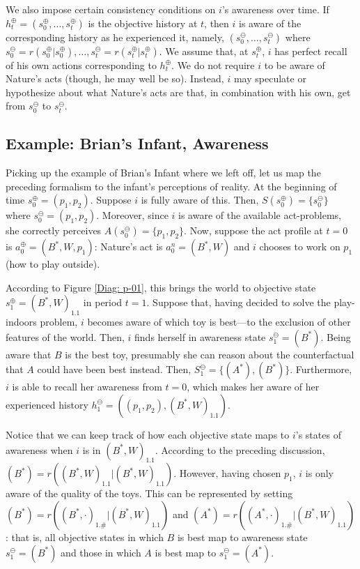 \documentclass[
11pt,
titlepage,
reqno,
]{article}%
\theoremstyle{definition}
\begin{document}
We also impose certain consistency conditions on $i$'s awareness over time.
If $h^\oplus_t=(s^\oplus_0,\ldots,s^\oplus_t)$ is the objective history at $t$, then $i$ is aware of the corresponding history as he experienced it, namely, $(s^\ominus_0,\ldots,s^\ominus_t)$ where $s^\ominus_0=r(s^\oplus_0|s^\oplus_0),\ldots, s^\ominus_t=r(s^\oplus_t|s^\oplus_t)$.
We assume that, at $s^\oplus_t$, $i$ has perfect recall of his own actions corresponding to  $h^\oplus_t$.
We do not require $i$ to be aware of Nature's acts (though, he may well be so).
Instead, $i$ may speculate or hypothesize about what Nature's acts are that, in combination with his own, get from $s^\ominus_0$ to $s^\ominus_t$.

\subsection{Example: Brian's Infant, Awareness}	
Picking up the example of Brian's Infant where we left off, let us map the preceding formalism to the infant's perceptions of reality.
At the beginning of time $s^\oplus_0=(p_1,p_2)$.
Suppose $i$ is fully aware of this.
Then, $S(s^\oplus_0)=\{s^\ominus_0\}$ where $s^\ominus_0=(p_1,p_2)$.
Moreover, since $i$ is aware of the available act-problems, she correctly perceives $A(s^\ominus_0)=\{p_1,p_2\}$.
Now, suppose the act profile at $t=0$ is $a^\oplus_0=(B^\ast,W,p_1)$: Nature's act is $a^n_0=(B^\ast,W)$ and $i$ chooses to work on $p_1$ (how to play outside).

According to Figure \ref{Diag: p-01}, this brings the world to objective state $s^\oplus_1=(B^\ast,W)_{1.1}$ in period $t=1$.
Suppose that, having decided to solve the play-indoors problem, $i$ becomes aware of which toy is best---to the exclusion of other features of the world.
Then, $i$ finds herself in awareness state $s^\ominus_1=(B^\ast)$.
Being aware that $B$ is the best toy, presumably she can reason about the counterfactual that $A$ could have been best instead.
Then, $S^\ominus_1=\{(A^\ast),(B^\ast)\}$.
Furthermore, $i$ is able to recall her awareness from $t=0$, which makes her aware of her experienced history $h_1^\ominus=\left((p_1,p_2),(B^\ast,W)_{1.1}\right)$.

Notice that we can keep track of how each objective state maps to $i$'s states of awareness when $i$ is in $(B^\ast,W)_{1.1}$. 
According to the preceding discussion, $(B^\ast)=r((B^\ast,W)_{1.1}|(B^\ast,W)_{1.1})$.
However, having chosen $p_1$, $i$ is only aware of the quality of the toys.
This can be represented by setting $(B^\ast)=r((B^\ast,\cdot)_{1.\#}|(B^\ast,W)_{1.1})$ and $(A^\ast)=r((A^\ast,\cdot)_{1.\#}|(B^\ast,W)_{1.1})$: that is, all objective states in which $B$ is best map to awareness state $s^\ominus_1=(B^\ast)$ and those in which $A$ is best map to $s^\ominus_1=(A^\ast)$.
\end{document}
